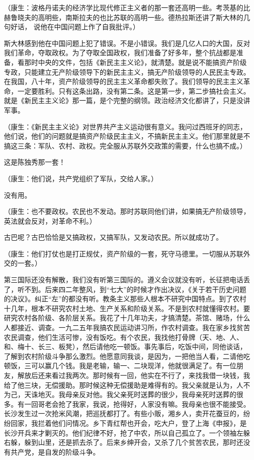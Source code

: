 （康生：波格丹诺夫的经济学比现代修正主义者的那一套还高明一些。考茨基的比赫鲁晓夫的高明些，南斯拉夫的也比苏联的高明一些。德热拉斯还讲了斯大林的几句好话， 说他在中国问题上作了自我批评。）

斯大林感到他在中国问题上犯了错误。不是小错误。我们是几亿人口的大国，反对我们革命，夺取政权。为了夺取全国政权，我们准备了好多年，整个抗战都是准备，看那时中央的文件，包括《新民主主义论》，就清楚。就是说不能搞资产阶级专政，只能建立无产阶级领导下的新民主主义，搞无产阶级领导的人民民主专政。在我国，八十年，资产阶级领导的民主主义革命都失败了。我们领导的民主主义革命，一定要胜利。只有这条出路，没有第二条。这是第一步，第二步搞社会主义。就是《新民主主义论》那一篇，是个完整的纲领。政治经济文化都讲了，只是没讲军事。

（康生：《新民主主义论》对世界共产主义运动很有意义。我问过西班牙的同志，他们说，他们的问题就是搞资产阶级民主主义，不搞新民主主义。他们那里就是不搞这三条：军队、农村、政权。完全服从苏联外交政策的需要，什么也搞不成。）

这是陈独秀那一套！

（康生：他们说，共产党组织了军队，交给人家。）

没有用。

（康生：也不要政权。农民也不发动。那时苏联同他们讲，如果搞无产阶级领导，英法就会反对，对革命不利。）

古巴呢？古巴恰恰是又搞政权，又搞军队，又发动农民。所以就成功了。

（康生：他们打仗也是打正规仗，资产阶级的一套，死守马德里。一切服从苏联外交的一套。）

第三国际还没有解散，我们没有听第三国际的。遵义会议就没有听，长征把电话丢了，听不到。后来四二年整风，到“七大”的时候才作出决议，《关于若干历史问题的决议》。纠正“左”的都没有听。教条主义那些人根本不研究中国特点。到了农村十几年，根本不研究农村土地、生产关系和阶级关系。不是到农村就懂得农村。要研究农村各阶级、各阶层关系。我花了十几年功夫，才搞清楚。茶馆、赌场，什么人都接近、调查。一九二五年我搞农民运动讲习所，作农村调查。我在家乡找贫苦农民调查，他们生活可惨，没有饭吃。有个农民，我找他打骨牌（天、地、人、和、梅十、长三、板凳），然后请他吃一顿饭。事先事后，吃饭中间，同他谈话，了解到农村阶级斗争那么激烈。他愿意同我谈，是因为，一把他当人看，二请他吃顿饭，三可以赢几个钱。我是老输，输一、二块现洋，他就很满足了。有一位朋友，解放后还来看过我两次。那时候有一回，他实在不行了，来找我借一块钱，我给了他三块，无偿援助。那时候这种无偿援助是难得有的。我父亲就是认为，人不为己，天诛地灭。我母亲反对他。我父亲死时送葬的很少，我母亲死时送葬的很多。有一回哥老会抢了我家，我说，抢得好，人家没有嘛。我母亲也很不能接受。长沙发生过一次抢米风潮，把巡抚都打了。有些小贩，湘乡人，卖开花蚕豆的，纷纷回家，我拦着他们问情况。乡下青红帮也开会，吃大户，登了上海《申报》，是长沙开兵来才剿灭的。他们纪律不好，抢了中农，所以自己孤立了。一个领袖左躲右躲，躲到山里，还是抓去杀了。后来乡绅开会，又杀了几个贫苦农民，那时还没有共产党，是自发的阶级斗争。

